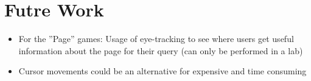 \documentclass{article}
\theoremstyle{definition}
\theoremstyle{remark}
\begin{document}
\section{Futre Work}
\begin{itemize}
    \item For the ''Page'' games: Usage of eye-tracking to see where users get useful information about the page for their query (can only be performed in a lab)
    \item Cursor movements could be an alternative for expensive and time consuming \cite{clicks}
\end{itemize}


\printbibliography
\end{document}
